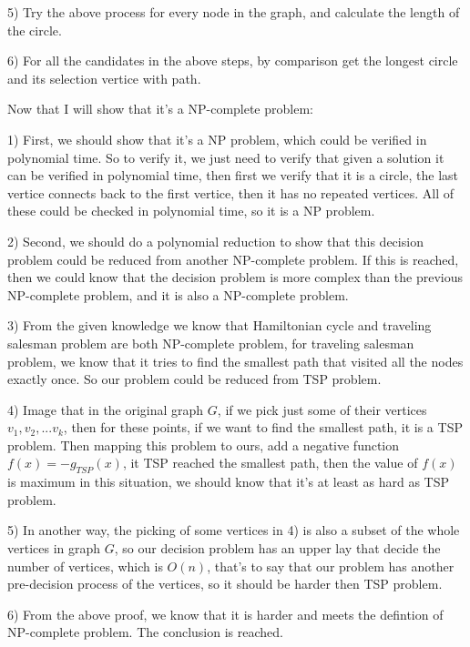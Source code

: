 \documentclass{article}
\begin{document}
5) Try the above process for every node in the graph, and calculate the length of the circle. 

6) For all the candidates in the above steps, by comparison get the longest circle and its selection vertice with path.

Now that I will show that it's a NP-complete problem:

1) First, we should show that it's a NP problem, which could be verified in polynomial time. So to verify it, we just need to verify that given a solution it can be verified in polynomial time, then first we verify that it is a circle, the last vertice connects back to the first vertice, then it has no repeated vertices. All of these could be checked in polynomial time, so it is a NP problem.

2) Second, we should do a polynomial reduction to show that this decision problem could be reduced from another NP-complete problem. If this is reached, then we could know that the decision problem is more complex than the previous NP-complete problem, and it is also a NP-complete problem.

3) From the given knowledge we know that Hamiltonian cycle and traveling salesman problem are both NP-complete problem, for traveling salesman problem, we know that it tries to find the smallest path that visited all the nodes exactly once. So our problem could be reduced from TSP problem.

4) Image that in the original graph ${G}$, if we pick just some of their vertices$v_{1}, v_{2}, ... v_{k}$, then for these points, if we want to find the smallest path, it is a TSP problem. Then mapping this problem to ours, add a negative function $f(x) = - g_{TSP}(x)$, it TSP reached the smallest path, then the value of $f(x)$ is maximum in this situation, we should know that it's at least as hard as TSP problem.

5) In another way, the picking of some vertices in 4) is also a subset of the whole vertices in graph $G$, so our decision problem has an upper lay that decide the number of vertices, which is $O(n)$, that's to say that our problem has another pre-decision process of the vertices, so it should be harder then TSP problem.

6) From the above proof, we know that it is harder and meets the defintion of NP-complete problem. The conclusion is reached.
\end{document}
